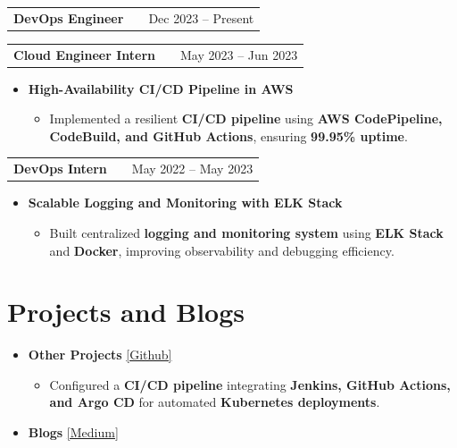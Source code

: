 \documentclass[a4paper,10.999999pt]{article}
\makeatletter
\newenvironment{joblong}[2]
        {
        \begin{tabularx}{\linewidth}{@{}l X r@{}}
        \textbf{#1} & \hfill &  #2 \\[-1pt]
        \end{tabularx}
        \vspace{-3.2pt}
        \begin{minipage}[t]{\linewidth}
        \begin{itemize}[nosep, after=\strut, leftmargin=0.5em, itemsep=1pt, label=\raisebox{0.2ex}{\tiny$\circ$}]
        }
        {
        \end{itemize}
        \end{minipage}
        \vspace{-3.2pt}
        }
\makeatother
\begin{document}
\begin{joblong}{DevOps Engineer}{Dec 2023 -- Present}
\begin{itemize}
    \end{itemize}

    \end{joblong}

    \begin{joblong}{Cloud Engineer Intern}{May 2023 -- Jun 2023}
    Mactores Innovation
    \item \textbf{High-Availability CI/CD Pipeline in AWS}
    \begin{itemize}[nosep, leftmargin=1.5em, itemsep=1pt, label=\raisebox{0.25ex}{\small$-$}]
    \item Implemented a resilient \textbf{CI/CD pipeline} using \textbf{AWS CodePipeline, CodeBuild, and GitHub Actions}, ensuring \textbf{99.95\% uptime}.
    \end{itemize}
    \end{joblong}

    \begin{joblong}{DevOps Intern}{May 2022 -- May 2023}
    Motorola Solutions
    \item \textbf{Scalable Logging and Monitoring with ELK Stack}
    \begin{itemize}[nosep, leftmargin=1.5em, itemsep=1pt, label=\raisebox{0.25ex}{\small$-$}]
    \item Built centralized \textbf{logging and monitoring system} using \textbf{ELK Stack} and \textbf{Docker}, improving observability and debugging efficiency.
    \end{itemize}
    \end{joblong}


    \section{Projects and Blogs}

    \begin{itemize}[leftmargin=1.5em, itemsep=2pt, label=\raisebox{0.25ex}{\tiny$\circ$}]
    \item \textbf{Other Projects} \href{https://github.com/KelviManavadaria-17}{[Github]}
    \begin{itemize}[nosep, leftmargin=1.5em, itemsep=1pt, label=\raisebox{0.25ex}{\small$-$}]
    \item Configured a \textbf{CI/CD pipeline} integrating \textbf{Jenkins, GitHub Actions, and Argo CD} for automated \textbf{Kubernetes deployments}.
    \end{itemize}
    \item \textbf{Blogs} \href{https://medium.com/@KelviManavadaria}{[Medium]}
    \end{itemize}
\end{document}
